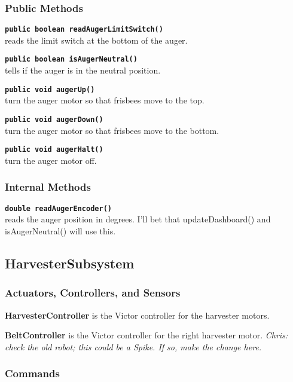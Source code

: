 \documentclass[]{article}
\begin{document}
\subsubsection{Public Methods}

\noindent \texttt{\textbf{public boolean readAugerLimitSwitch()}} \\
reads the limit switch at the bottom of the auger.

\noindent \texttt{\textbf{public boolean isAugerNeutral()}} \\
tells if the auger is in the neutral position.

\noindent \texttt{\textbf{public void augerUp()}} \\
turn the auger motor so that frisbees move to the top.

\noindent \texttt{\textbf{public void augerDown()}} \\
turn the auger motor so that frisbees move to the bottom.

\noindent \texttt{\textbf{public void augerHalt()}} \\
turn the auger motor off.

\subsubsection{Internal Methods}

\noindent \texttt{\textbf{double readAugerEncoder()}} \\
reads the auger position in degrees. I'll bet that updateDashboard() and isAugerNeutral() will use this.


\subsection{HarvesterSubsystem}

\subsubsection{Actuators, Controllers, and Sensors}

\textbf{HarvesterController} is the Victor controller for the harvester motors.

\textbf{BeltController} is the Victor controller for the right harvester motor. \textit{Chris: check the old robot; this could be a Spike. If so, make the change here.}

\subsubsection{Commands}
\end{document}
